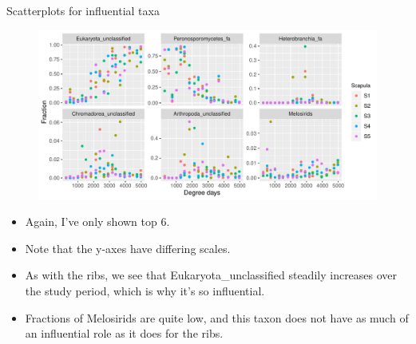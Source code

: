 \documentclass{beamer}
\begin{document}
\begin{frame}{Scatterplots for influential taxa}

  \begin{center}
    \begin{figure}
      \includegraphics[width=4.75in]{w_scapulae/infl_scapula_family_scatter}
    \end{figure}
  \end{center}
  \vspace{-0.25in}
  {\scriptsize
  \begin{itemize}
  \item Again, I've only shown top 6.
  \item Note that the y-axes have differing scales.
  \item As with the ribs, we see that Eukaryota\_unclassified steadily increases
  over the study period, which is why it's so influential.
  \item Fractions of Melosirids are quite low, and this taxon does not have as
  much of an influential role as it does for the ribs.
  \end{itemize}
  }

\end{frame}
\end{document}
